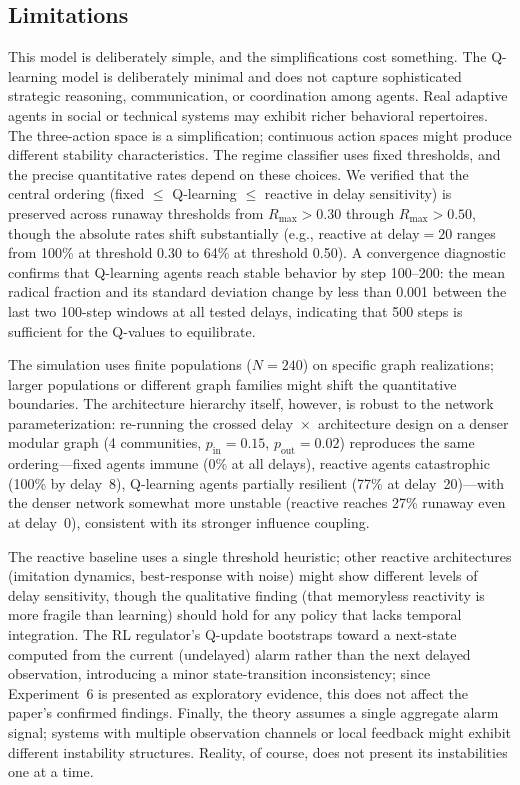 \subsection{Limitations}

This model is deliberately simple, and the simplifications cost something. The Q-learning model is deliberately minimal and does not capture sophisticated strategic reasoning, communication, or coordination among agents. Real adaptive agents in social or technical systems may exhibit richer behavioral repertoires. The three-action space is a simplification; continuous action spaces might produce different stability characteristics. The regime classifier uses fixed thresholds, and the precise quantitative rates depend on these choices. We verified that the central ordering (fixed $\leq$ Q-learning $\leq$ reactive in delay sensitivity) is preserved across runaway thresholds from $R_{\max}>0.30$ through $R_{\max}>0.50$, though the absolute rates shift substantially (e.g., reactive at delay${}=20$ ranges from 100\% at threshold 0.30 to 64\% at threshold 0.50). A convergence diagnostic confirms that Q-learning agents reach stable behavior by step 100--200: the mean radical fraction and its standard deviation change by less than 0.001 between the last two 100-step windows at all tested delays, indicating that 500 steps is sufficient for the Q-values to equilibrate.

The simulation uses finite populations ($N=240$) on specific graph realizations; larger populations or different graph families might shift the quantitative boundaries. The architecture hierarchy itself, however, is robust to the network parameterization: re-running the crossed delay~$\times$~architecture design on a denser modular graph (4 communities, $p_{\mathrm{in}}=0.15$, $p_{\mathrm{out}}=0.02$) reproduces the same ordering---fixed agents immune (0\% at all delays), reactive agents catastrophic (100\% by delay~8), Q-learning agents partially resilient (77\% at delay~20)---with the denser network somewhat more unstable (reactive reaches 27\% runaway even at delay~0), consistent with its stronger influence coupling.

The reactive baseline uses a single threshold heuristic; other reactive architectures (imitation dynamics, best-response with noise) might show different levels of delay sensitivity, though the qualitative finding (that memoryless reactivity is more fragile than learning) should hold for any policy that lacks temporal integration. The RL regulator's Q-update bootstraps toward a next-state computed from the current (undelayed) alarm rather than the next delayed observation, introducing a minor state-transition inconsistency; since Experiment~6 is presented as exploratory evidence, this does not affect the paper's confirmed findings. Finally, the theory assumes a single aggregate alarm signal; systems with multiple observation channels or local feedback might exhibit different instability structures. Reality, of course, does not present its instabilities one at a time.

